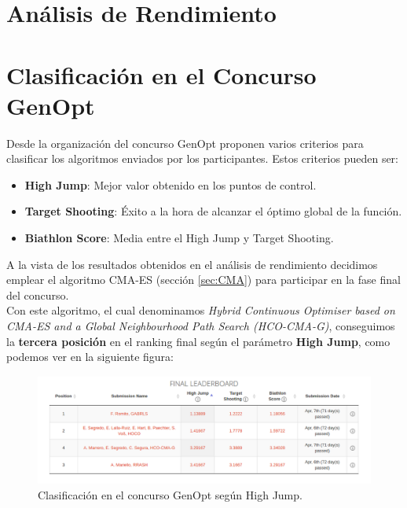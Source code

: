 \section{Análisis de Rendimiento}\label{sec:PERFORMANCE}


\section{Clasificación en el Concurso GenOpt}\label{sec:Competition}

Desde la organización del concurso GenOpt proponen varios criterios para clasificar los algoritmos enviados por los participantes. Estos criterios pueden ser:

\begin{itemize}
    	  	\item \textbf{High Jump}: Mejor valor obtenido en los puntos de control.
    	  	\item \textbf{Target Shooting}: Éxito a la hora de alcanzar el óptimo global de la función.
    	  	\item \textbf{Biathlon Score}: Media entre el High Jump y Target Shooting.
\end{itemize}

A la vista de los resultados obtenidos en el análisis de rendimiento decidimos emplear el algoritmo CMA-ES (sección \ref{sec:CMA}) para participar en la fase final del concurso. \\
Con este algoritmo, el cual denominamos \textit{Hybrid Continuous Optimiser based on CMA-ES and a Global Neighbourhood Path Search (HCO-CMA-G)}, conseguimos la \textbf{tercera posición} en el ranking final según el parámetro \textbf{High Jump}, como podemos ver en la siguiente figura: 

\begin{figure}[!ht]
  \centering
	\includegraphics[scale=0.5]{images/final}
  \caption{Clasificación en el concurso GenOpt según High Jump.}
\end{figure}

\newpage